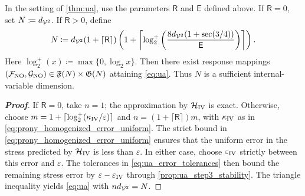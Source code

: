 \documentclass[3p, 12pt, preprint]{elsarticle}
\begin{document}
{\color{blue}
\begin{theorem}\label{thm:sufficient_dimension}
    In the setting of \cref{thm:ua}, use the parameters $\mathsf R$ and $\mathsf E$ defined above. If $\mathsf R=0$, set $N\coloneqq d_{{\mathcal{V}}^2}$. If $\mathsf R>0$, define
    \begin{equation*}
        N\coloneqq d_{{\mathcal{V}}^2}(1+\lceil\mathsf R\rceil)
        \left(1+\left\lceil
        \log_2^+\left(\frac{8d_{{\mathcal{V}}^2}(1+\sec(3/4))}{\mathsf E}\right)
        \right\rceil\right).
    \end{equation*}
    Here $\log_2^+(x)\coloneqq\max\{0,\log_2 x\}$. Then there exist response mappings $({\mathcal{F}}_{\rm NO},{\mathcal{G}}_{\rm NO})\in\mathfrak F(N)\times\mathfrak G(N)$ attaining \cref{eq:ua}. Thus $N$ is a sufficient internal-variable dimension.
\end{theorem}

\begin{proof}[\bf Proof]
If $\mathsf R=0$, take $n=1$; the approximation by ${\mathcal{H}}_{\rm IV}$ is exact. Otherwise, choose $m=1+\lceil\log_2^+(\kappa_{\rm IV}/\varepsilon)\rceil$ and $n=(1+\lceil\mathsf R\rceil)m$, with $\kappa_{\rm IV}$ as in \cref{eq:prony_homogenized_error_uniform}. The strict bound in \cref{eq:prony_homogenized_error_uniform} ensures that the uniform error in the stress predicted by ${\mathcal{H}}_{\rm IV}$ is less than $\varepsilon$. In either case, choose $\varepsilon_{\rm IV}$ strictly between this error and $\varepsilon$. The tolerances in \cref{eq:ua_error_tolerances} then bound the remaining stress error by $\varepsilon-\varepsilon_{\rm IV}$ through \cref{prop:ua_step3_stability}. The triangle inequality yields \cref{eq:ua} with $nd_{{\mathcal{V}}^2}=N$.
\end{proof}
}
\end{document}

